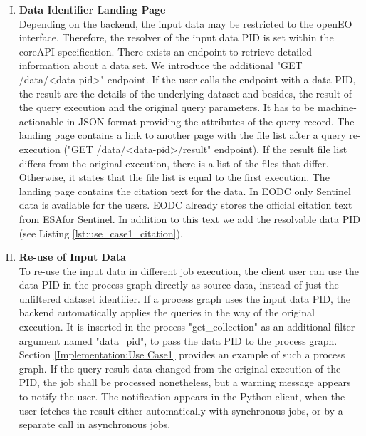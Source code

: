 \documentclass[draft,final]{vutinfth} %
\newcommand{\bgoesswein}[1]{{\color{blue}#1}}
\begin{document}
\begin{enumerate}[I.]
\newpage
\item \textbf{Data Identifier Landing Page} \\
	Depending on the backend, the input data may be restricted to the openEO interface. Therefore, the resolver of the input data PID is set within the coreAPI specification. There exists an endpoint to retrieve detailed information about a data set. We introduce the additional "GET /data/<data-pid>" endpoint. If the user calls the endpoint with a data PID, the result are the details of the underlying dataset and besides, the result of the query execution and the original query parameters. \bgoesswein{It has to be machine-actionable in JSON format providing the attributes of the query record.} The landing page contains a link to another page with the file list after a query re-execution ("GET /data/<data-pid>/result" endpoint). If the result file list differs from the original execution, there is a list of the files that differ. Otherwise, it states that the file list is equal to the first execution. 
	\bgoesswein{The landing page contains the citation text for the data. In EODC only Sentinel data is available for the users. EODC already stores the official citation text from ESAfor Sentinel. In addition to this text we add the resolvable data PID (see Listing \ref{lst:use_case1_citation}).}


\item \textbf{Re-use of Input Data} \\
	To re-use the input data in different job execution, the client user can use the data PID in the process graph directly as source data, instead of just the unfiltered dataset identifier. If a process graph uses the input data PID, the backend automatically applies the queries in the way of the original execution. It is inserted in the process "get\_collection" as an additional filter argument named "data\_pid", to pass the data PID to the process graph. Section \ref{Implementation:Use Case1} provides an example of such a process graph. If the query result data changed from the original execution of the PID, the job shall be processed nonetheless, but a warning message appears to notify the user. \bgoesswein{The notification appears in the Python client, when the user fetches the result either automatically with synchronous jobs, or by a separate call in asynchronous jobs.}   
\end{enumerate}
\end{document}
